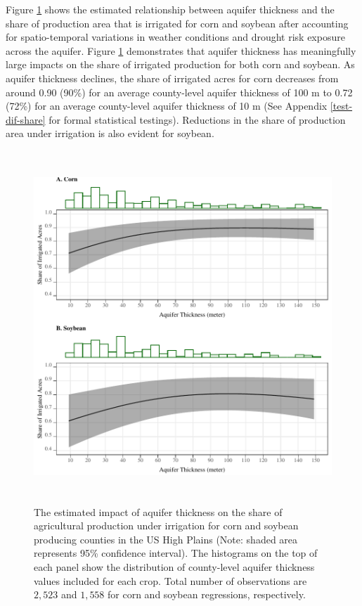 \documentclass[
]{article}
\begin{document}
Figure \ref{fig:ir-share} shows the estimated relationship between aquifer thickness and the share of production area that is irrigated for corn and soybean after accounting for spatio-temporal variations in weather conditions and drought risk exposure across the aquifer. Figure \ref{fig:ir-share} demonstrates that aquifer thickness has meaningfully large impacts on the share of irrigated production for both corn and soybean. As aquifer thickness declines, the share of irrigated acres for corn decreases from around 0.90 (90\%) for an average county-level aquifer thickness of 100 m to 0.72 (72\%) for an average county-level aquifer thickness of 10 m (See Appendix \ref{test-dif-share} for formal statistical testings). Reductions in the share of production area under irrigation is also evident for soybean.

\begin{figure}[H]

{\centering \includegraphics[width=6in,height=500px,]{../../Figures/g_share} 

}

\caption{The estimated impact of aquifer thickness on the share of agricultural production under irrigation for corn and soybean producing counties in the US High Plains (Note: shaded area represents 95\% confidence interval). The histograms on the top of each panel show the distribution of county-level aquifer thickness values included for each crop. Total number of observations are $2,523$ and $1,558$ for corn and soybean regressions, respectively.}\label{fig:ir-share}
\end{figure}
\end{document}

